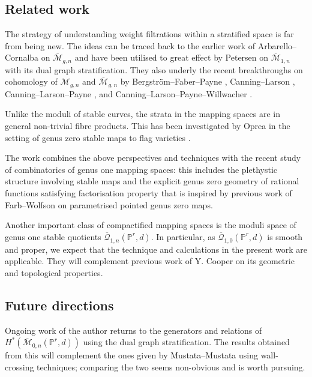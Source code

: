 \documentclass[12pt,reqno]{amsart}
\theoremstyle{definition}
\theoremstyle{definition}
\theoremstyle{definition}
\theoremstyle{definition}
\newcommand{\ol}[1]{\overline{#1}}
\newcommand{\PP}{\mathbb{P}}
\newcommand{\Mcal}{\mathcal{M}}
\newcommand{\Mbar}{\ol{\Mcal}}
\newcommand{\M}{\mathcal{M}}
\begin{document}
\subsection{Related work}
The strategy of understanding weight filtrations within a stratified space is far from being new. The ideas can be traced back to the earlier work of Arbarello--Cornalba \cite{ac} on $\Mbar_{g,n}$ and have been utilised to great effect by Petersen \cite{pet} on $\Mbar_{1,n}$ with its dual graph stratification. They also underly the recent breakthroughs on cohomology of $\M_{g,n}$ and $\Mbar_{g,n}$ by Bergström--Faber--Payne \cite{bfp}, Canning--Larson \cite{clchow}, Canning--Larson--Payne \cite{clp, clp11}, and Canning--Larson--Payne--Willwacher \cite{clpw, clpw2, clpw25}.

Unlike the moduli of stable curves, the strata in the mapping spaces are in general non-trivial fibre products. This has been investigated by Oprea in the setting of genus zero stable maps to flag varieties \cite{opreaflag}.

The work combines the above perspectives and techniques with the recent study of combinatorics of genus one mapping spaces: this includes the plethystic structure involving stable maps \cite{genusonechar} and the explicit genus zero geometry of rational functions satisfying factorisation property \cite{vzdualcomplex} that is inspired by previous work of Farb--Wolfson \cite{farbwolf} on parametrised pointed genus zero maps.

Another important class of compactified mapping spaces is the moduli space of genus one stable quotients \cite{mop} $\overline{\mathcal{Q}}_{1,n}(\PP^r,d).$ In particular, as $\overline{\mathcal{Q}}_{1,0}(\PP^r,d)$ is smooth and proper, we expect that the technique and calculations in the present work are applicable. They will complement previous work of Y. Cooper \cite{Cooper2014} on its geometric and topological properties.

\subsection{Future directions}
Ongoing work of the author \cite{relations} returns to the generators and relations of $H^*(\Mbar_{0,n}(\mathbb{P}^r,d))$ using the dual graph stratification. The results obtained from this will complement the ones given by Mustata--Mustata \cite{mmchow,mminter,mmtaut} using wall-crossing techniques; comparing the two seems non-obvious and is worth pursuing.
\end{document}
